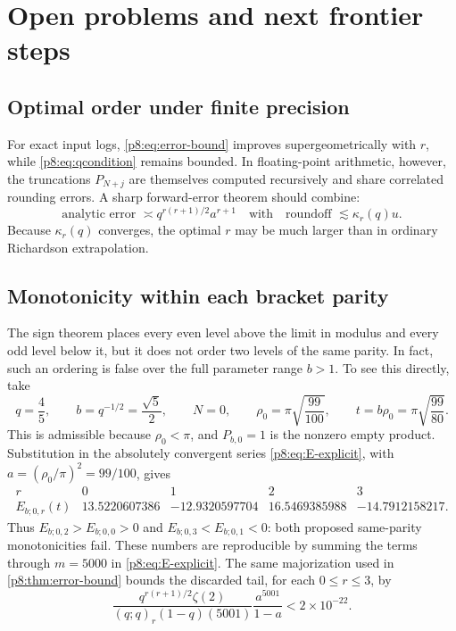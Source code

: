 \documentclass[11pt]{article}
\numberwithin{equation}{section}
\theoremstyle{definition}
\theoremstyle{remark}
\begin{document}
\section{Open problems and next frontier steps}
\label{p8:sec:open}

\subsection{Optimal order under finite precision}

For exact input logs, \cref{p8:eq:error-bound} improves supergeometrically with $r$, while \cref{p8:eq:qcondition} remains bounded. In floating-point arithmetic, however, the truncations $P_{N+j}$ are themselves computed recursively and share correlated rounding errors. A sharp forward-error theorem should combine:
\[
\text{analytic error }\asymp q^{r(r+1)/2}a^{r+1}
\quad\text{with}\quad
\text{roundoff }\lesssim\kappa_r(q)u.
\]
Because $\kappa_r(q)$ converges, the optimal $r$ may be much larger than in ordinary Richardson extrapolation.

\subsection{Monotonicity within each bracket parity}

The sign theorem places every even level above the limit in modulus and every odd level
below it, but it does not order two levels of the same parity.  In fact, such an ordering is
false over the full parameter range $b>1$.  To see this directly, take
\[
 q=\frac45,\qquad b=q^{-1/2}=\frac{\sqrt5}{2},\qquad N=0,
 \qquad \rho_0=\pi\sqrt{\frac{99}{100}},
 \qquad t=b\rho_0=\pi\sqrt{\frac{99}{80}}.
\]
This is admissible because $\rho_0<\pi$, and $P_{b,0}=1$ is the nonzero empty product.
Substitution in the absolutely convergent series \eqref{p8:eq:E-explicit}, with
$a=(\rho_0/\pi)^2=99/100$, gives
\[
\begin{array}{c|rrrr}
r&0&1&2&3\\ \hline
E_{b;0,r}(t)
& 13.5220607386&-12.9320597704&16.5469385988&-14.7912158217.
\end{array}
\]
Thus $E_{b;0,2}>E_{b;0,0}>0$ and
$E_{b;0,3}<E_{b;0,1}<0$: both proposed same-parity monotonicities fail.
These numbers are reproducible by summing the terms through $m=5000$ in
\eqref{p8:eq:E-explicit}.  The same majorization used in \cref{p8:thm:error-bound} bounds the
discarded tail, for each $0\le r\le3$, by
\[
 \frac{q^{r(r+1)/2}\zeta(2)}
 {(q;q)_r(1-q)(5001)}\frac{a^{5001}}{1-a}<2\times10^{-22}.
\]
\end{document}
